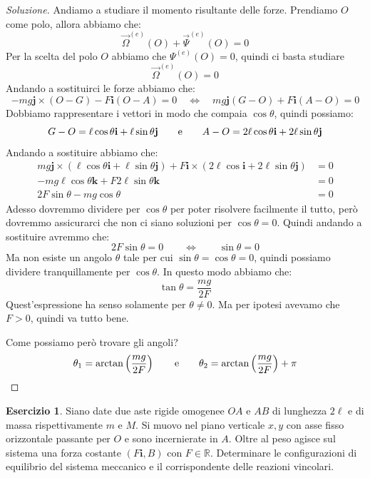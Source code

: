 \documentclass[11pt,a4paper,twoside]{article}
\theoremstyle{definition}
\newtheorem{ese}{Esercizio}[section]
\newenvironment{sol}
	{\renewcommand\qedsymbol{$\blacksquare$}\begin{proof}[Soluzione]}
	{\end{proof}}
\begin{document}
\begin{sol}
	Andiamo a studiare il momento risultante delle forze. Prendiamo $O$ come polo, allora abbiamo che:
	\[ \vec \Omega^{(e)}(O) + \vec \Psi^{(e)}(O) = 0 \]
	Per la scelta del polo $O$ abbiamo che $\Psi^{(e)}(O) = 0$, quindi ci basta studiare
	\[ \vec \Omega^{(e)}(O) = 0 \]
	Andando a sostituirci le forze abbiamo che:
	\[ -mg \mathbf j \times (O-G) - F \mathbf i (O-A) = 0 \quad \Leftrightarrow \quad mg\mathbf j(G-O) + F \mathbf i(A-O) = 0 \]
	Dobbiamo rappresentare i vettori in modo che compaia $\cos \theta$, quindi possiamo:
	\[G-O = \ell \cos \theta \mathbf i + \ell \sin \theta \mathbf j\qquad \text e \qquad A-O = 2\ell \cos \theta \mathbf i + 2 \ell \sin \theta \mathbf j\]
	Andando a sostituire abbiamo che:
	\begin{align*}
		mg \mathbf j \times (\ell \cos \theta \mathbf i + \ell \sin \theta \mathbf j) + F \mathbf i \times (2 \ell \cos \mathbf i + 2 \ell \sin \theta \mathbf j)& = 0\\
		-mg\ell \cos \theta \mathbf k + F 2 \ell \sin \theta \mathbf k & = 0\\
		2 F \sin \theta - mg\cos \theta &= 0
	\end{align*}
	Adesso dovremmo dividere per $\cos \theta$ per poter risolvere facilmente il tutto, però dovremmo assicurarci che non ci siano soluzioni per $\cos \theta = 0$. Quindi andando a sostituire avremmo che:
	\[ 2F \sin \theta = 0 \qquad \Leftrightarrow \qquad \sin \theta = 0\]
	Ma non esiste un angolo $\theta$ tale per cui $\sin \theta = \cos \theta = 0$, quindi possiamo dividere tranquillamente per $\cos \theta$. In questo modo abbiamo che:
	\[ \tan \theta = \frac{mg}{2F} \]
	Quest'espressione ha senso solamente per $\theta \neq 0$. Ma per ipotesi avevamo che $F>0$, quindi va tutto bene.

	Come possiamo però trovare gli angoli?
	\[ \theta_1 = \arctan\left( \frac{mg}{2F} \right) \qquad \text e \qquad \theta_2 = \arctan\left( \frac{mg}{2F} \right) + \pi\]
\end{sol}

\begin{ese}\label{ese2}
	Siano date due aste rigide omogenee $OA$ e $AB$ di lunghezza $2\ell$ e di massa rispettivamente $m$ e $M$. Si muovo nel piano verticale $x,y$ con asse fisso orizzontale passante per $O$ e sono incernierate in $A$. Oltre al peso agisce sul sistema una forza costante $(F \mathbf i, B)$ con $F \in \mathbb R$. Determinare le configurazioni di equilibrio del sistema meccanico e il corrispondente delle reazioni vincolari.
\end{ese}
\end{document}
